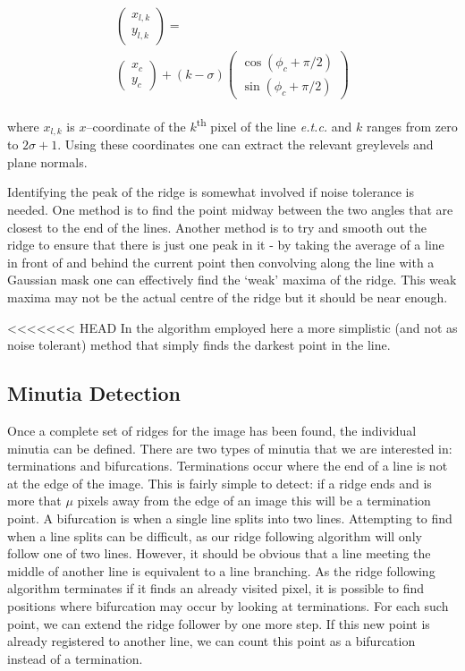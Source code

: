 \documentclass[11pt,a4paper]{article}
\begin{document}
\begin{multicols}{2}
		\begin{equation}
		\begin{split}
			\begin{pmatrix}
			x_{l,k} \\
			y_{l,k}
			\end{pmatrix}
			= \\
			\begin{pmatrix}
			x_c \\
			y_c
			\end{pmatrix}
			+ (k - \sigma)
			\begin{pmatrix}
			\cos{(\phi_c + \pi/2)} \\
			\sin{(\phi_c + \pi/2)}
			\end{pmatrix}
		\end{split}
		\end{equation}

		where $x_{l,k}$ is $x$--coordinate of the $k$\textsuperscript{th} pixel of the line \textit{e.t.c.} and $k$ ranges from zero to $2 \sigma + 1$. Using these coordinates one can extract the relevant greylevels and plane normals.

		Identifying the peak of the ridge is somewhat involved if noise tolerance is needed. One method is to find the point midway between the two angles that are closest to the end of the lines. Another method is to try and smooth out the ridge to ensure that there is just one peak in it - by taking the average of a line in front of and behind the current point then convolving along the line with a Gaussian mask one can effectively find the `weak' maxima of the ridge. This weak maxima may not be the actual centre of the ridge but it should be near enough.

<<<<<<< HEAD
In the algorithm employed here a more simplistic (and not as noise tolerant) method that simply finds the darkest point in the line.
			
\subsection{Minutia Detection}
        Once a complete set of ridges for the image has been found, the individual minutia can be defined. There are two types of minutia that we are interested in: terminations and bifurcations. Terminations occur where the end of a line is not at the edge of the image. This is fairly simple to detect: if a ridge ends and is more that $\mu$ pixels away from the edge of an image this will be a termination point. A bifurcation is when a single line splits into two lines. Attempting to find when a line splits can be difficult, as our ridge following algorithm will only follow one of two lines. However, it should be obvious that a line meeting the middle of another line is equivalent to a line branching. As the ridge following algorithm terminates if it finds an already visited pixel, it is possible to find positions where bifurcation may occur by looking at terminations. For each such point, we can extend the ridge follower by one more step. If this new point is already registered to another line, we can count this point as a bifurcation instead of a termination.


\end{multicols}
\end{document}
